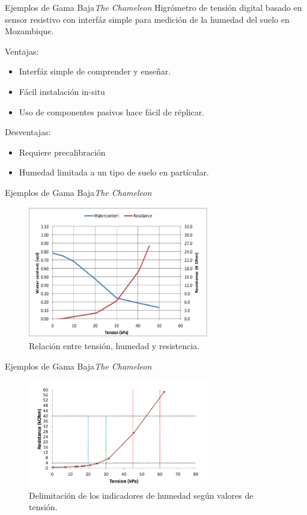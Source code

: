 \documentclass[]{beamer}
\begin{document}
\begin{frame}{Ejemplos de Gama Baja}{\emph{The Chameleon}}
  Higrómetro de tensión digital basado en sensor resistivo con interfáz simple para medición de la humedad del suelo en Mozambique.

  Ventajas:
  \begin{itemize}
    \item Interfáz simple de comprender y enseñar.
    \item Fácil instalación in-situ
    \item Uso de componentes pasivos hace fácil de réplicar.
  \end{itemize}

  Desventajas:
  \begin{itemize}
    \item Requiere precalibración
    \item Humedad limitada a un tipo de suelo en partícular.
  \end{itemize}
\end{frame}
\begin{frame}{Ejemplos de Gama Baja}{\emph{The Chameleon}}
  \begin{figure}
    \includegraphics[width=0.7\textwidth]{Docs/chameleon2}
    \caption{Relación entre tensión, humedad y resistencia.}
    \label{}
  \end{figure}
\end{frame}

\begin{frame}{Ejemplos de Gama Baja}{\emph{The Chameleon}}
  \begin{figure}
    \includegraphics[width=0.7\textwidth]{Docs/chameleon3}
    \caption{Delimitación de los indicadores de humedad según valores de tensión.}
    \label{}
  \end{figure}
\end{frame}
\end{document}
